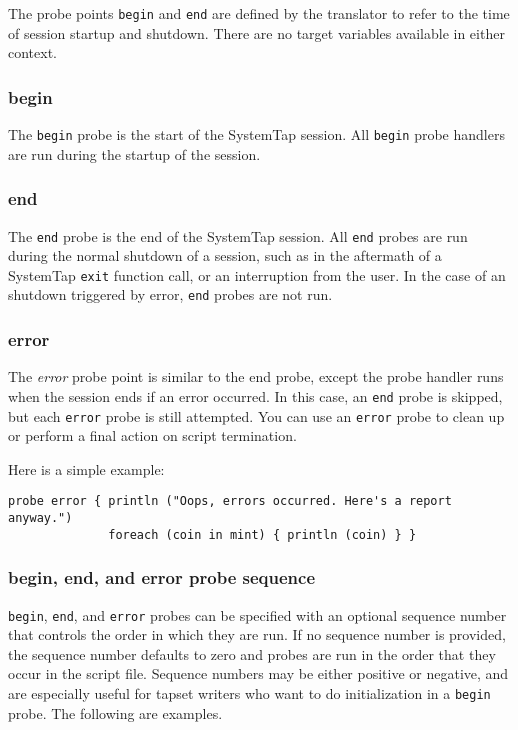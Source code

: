 \documentclass[twoside,english]{article}
\newenvironment{vindent}
{\begin{list}{}{\setlength{\listparindent}{6pt}}
\item[]}
{\end{list}}
\begin{document}
The probe points \texttt{begin} and \texttt{end} are defined by the translator
to refer to the time of session startup and shutdown. There are no target
variables available in either context.


\subsubsection{begin}
The \texttt{begin} probe is the start of the SystemTap session.
All \texttt{begin}
probe handlers are run during the startup of the session.


\subsubsection{end}
The \texttt{end} probe is the end of the SystemTap session. All \texttt{end}
probes are run during the normal shutdown of a session, such as in the aftermath
of a SystemTap \texttt{exit} function call, or an interruption from the user.
In the case of an shutdown triggered by error, \texttt{end} probes are not run.


\subsubsection{error}
The \emph{error} probe point is similar to the end
probe, except the probe handler runs when the session ends if an error
occurred.  In this case, an \texttt{end} probe is skipped, but each
\texttt{error} probe is still attempted.  You can use an
\texttt{error} probe to clean up or perform a final action on script
termination.

Here is a simple example:
\begin{vindent}
\begin{verbatim}
probe error { println ("Oops, errors occurred. Here's a report anyway.")
              foreach (coin in mint) { println (coin) } }
\end{verbatim}
\end{vindent}


\subsubsection{begin, end, and error probe sequence}
\texttt{begin}, \texttt{end}, and \texttt{error} probes can be
specified with an optional sequence number that controls the order in
which they are run. If no sequence number is provided, the sequence
number defaults to zero and probes are run in the order that they
occur in the script file. Sequence numbers may be either positive or
negative, and are especially useful for tapset writers who want to do
initialization in a \texttt{begin} probe. The following are examples.
\end{document}
